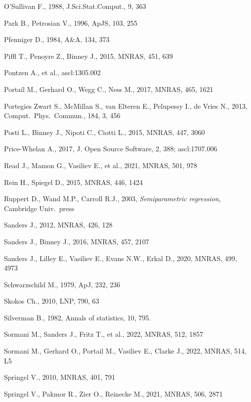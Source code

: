 \documentclass[12pt]{article}
\begin{document}
\begin{thebibliography}{99}
O'Sullivan F., 1988, J.Sci.Stat.Comput., 9, 363

Park B., Petrosian V., 1996, ApJS, 103, 255

Pfenniger D., 1984, A\&A, 134, 373

Piffl T., Penoyre Z., Binney J., 2015, MNRAS, 451, 639

Pontzen A., et al., ascl:1305.002

Portail M., Gerhard O., Wegg C., Ness M., 2017, MNRAS, 465, 1621

Portegies Zwart S., McMillan S., van Elteren E., Pelupessy I., de Vries N., 2013, Comput.\ Phys.\ Commun., 184, 3, 456

Posti L., Binney J., Nipoti C., Ciotti L., 2015, MNRAS, 447, 3060

Price-Whelan A., 2017, J. Open Source Software, 2, 388; ascl:1707.006

Read J., Mamon G., Vasiliev E., et al., 2021, MNRAS, 501, 978

Rein H., Spiegel D., 2015, MNRAS, 446, 1424

Ruppert D., Wand M.P., Carroll R.J., 2003, \textsl{Semiparametric regression}, Cambridge Univ.\ press

Sanders J., 2012, MNRAS, 426, 128

Sanders J., Binney J., 2016, MNRAS, 457, 2107

Sanders J., Lilley E., Vasiliev E., Evans N.W., Erkal D., 2020, MNRAS, 499, 4973

Schwarzschild M., 1979, ApJ, 232, 236

Skokos Ch., 2010, LNP, 790, 63

Silverman B., 1982, Annals of statistics, 10, 795.

Sormani M., Sanders J., Fritz T., et al., 2022, MNRAS, 512, 1857

Sormani M., Gerhard O., Portail M., Vasiliev E., Clarke J., 2022, MNRAS, 514, L5

Springel V., 2010, MNRAS, 401, 791

Springel V., Pakmor R., Zier O., Reinecke M., 2021, MNRAS, 506, 2871


\end{thebibliography}
\end{document}
